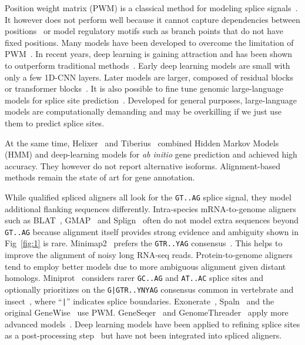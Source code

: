 \documentclass[webpdf,contemporary,large,namedate]{oup-authoring-template}%
\begin{document}
Position weight matrix (PWM) is a classical method for modeling splice signals~\citep{Staden:1984aa}.
It however does not perform well because it cannot capture dependencies between positions~\citep{Burge:1997uu}
or model regulatory motifs such as branch points that do not have fixed positions.
Many models have been developed to overcome the limitation of PWM~\citep{Capitanchik:2025aa}.
In recent years, deep learning is gaining attraction
and has been shown to outperform traditional methods~\citep{Zhang:2018aa,DBLP:journals/access/DuYDZZL18,Albaradei:2020aa}.
Early deep learning models are small with only a few 1D-CNN layers.
Later models are larger, composed of residual blocks~\citep{Jaganathan:2019aa,Zeng:2022aa,Xu:2024aa,Chao:2024aa} or transformer blocks~\citep{You:2024aa,Chen:2024aa}.
It is also possible to fine tune genomic large-language models for splice site prediction~\citep{Nguyen:2023aa,Dalla-Torre:2025aa,Brixi2025.02.18.638918}.
Developed for general purposes, large-language models are computationally demanding and may be overkilling if we just use them to predict splice sites.

At the same time, Helixer~\citep{Holst2023.02.06.527280} and Tiberius~\citep{Gabriel:2024aa}
combined Hidden Markov Models (HMM) and deep-learning models for \emph{ab initio} gene prediction and achieved high accuracy.
They however do not report alternative isoforms.
Alignment-based methods remain the state of art for gene annotation.

While qualified spliced aligners all look for the {\tt GT..AG} splice signal,
they model additional flanking sequences differently.
Intra-species mRNA-to-genome aligners such as BLAT~\citep{Kent:2002jk}, GMAP~\citep{Wu:2005vn} and Splign~\citep{Kapustin:2008tq} often do not model extra sequences beyond {\tt GT..AG}
because alignment itself provides strong evidence and ambiguity shown in Fig~\ref{fig:1} is rare.
Minimap2~\citep{Li:2018ab} prefers the {\tt GTR..YAG} consensus~\citep{Irimia:2008aa}.
This helps to improve the alignment of noisy long RNA-seq reads.
Protein-to-genome aligners tend to employ better models due to more ambiguous alignment given distant homologs.
Miniprot~\citep{Li:2023ab} considers rarer {\tt GC..AG} and {\tt AT..AC} splice sites and optionally prioritizes on the {\tt G|GTR..YNYAG} consensus
common in vertebrate and insect~\citep{Iwata:2011aa}, where ``{\tt |}'' indicates splice boundaries.
Exonerate~\citep{Slater:2005aa}, Spaln~\citep{Gotoh:2008aa,Iwata:2012aa,Gotoh:2024aa} and the original GeneWise~\citep{Birney:2004uy} use PWM.
GeneSeqer~\citep{Usuka:2000vi} and GenomeThreader~\citep{DBLP:journals/infsof/GremmeBSK05} apply more advanced models~\citep{Brendel:1998aa,Brendel:2004aa}.
Deep learning models have been applied to refining splice sites as a post-processing step~\citep{Chao:2024aa,Xia:2023aa}
but have not been integrated into spliced aligners.
\end{document}
